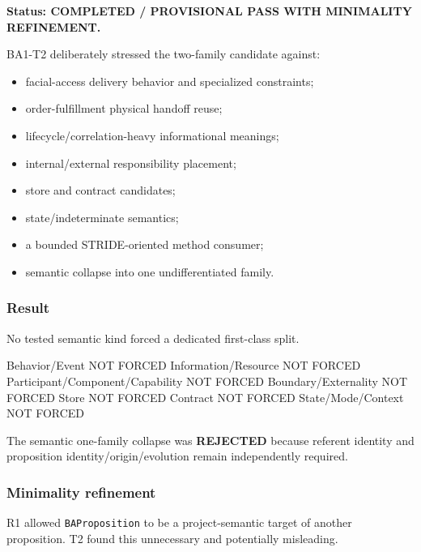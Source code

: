 \documentclass[
  10pt,
]{article}
\newenvironment{Shaded}{}{}
\newcommand{\NormalTok}[1]{#1}
\providecommand{\tightlist}{%
  \setlength{\itemsep}{0pt}\setlength{\parskip}{0pt}}
\begin{document}
\textbf{Status: COMPLETED / PROVISIONAL PASS WITH MINIMALITY
REFINEMENT.}

BA1-T2 deliberately stressed the two-family candidate against:

\begin{itemize}
\tightlist
\item
  facial-access delivery behavior and specialized constraints;
\item
  order-fulfillment physical handoff reuse;
\item
  lifecycle/correlation-heavy informational meanings;
\item
  internal/external responsibility placement;
\item
  store and contract candidates;
\item
  state/indeterminate semantics;
\item
  a bounded STRIDE-oriented method consumer;
\item
  semantic collapse into one undifferentiated family.
\end{itemize}

\subsubsection{Result}\label{result}

No tested semantic kind forced a dedicated first-class split.

\begin{Shaded}
\begin{Highlighting}[]
\NormalTok{Behavior/Event                    NOT FORCED}
\NormalTok{Information/Resource              NOT FORCED}
\NormalTok{Participant/Component/Capability  NOT FORCED}
\NormalTok{Boundary/Externality              NOT FORCED}
\NormalTok{Store                             NOT FORCED}
\NormalTok{Contract                          NOT FORCED}
\NormalTok{State/Mode/Context                NOT FORCED}
\end{Highlighting}
\end{Shaded}

The semantic one-family collapse was \textbf{REJECTED} because referent
identity and proposition identity/origin/evolution remain independently
required.

\subsubsection{Minimality refinement}\label{minimality-refinement}

R1 allowed \texttt{BAProposition} to be a project-semantic target of
another proposition. T2 found this unnecessary and potentially
misleading.
\end{document}
